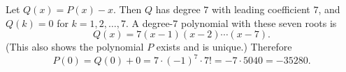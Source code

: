 Let \(Q(x)=P(x)-x\). Then \(Q\) has degree \(7\) with leading coefficient \(7\), and \(Q(k)=0\) for \(k=1,2,\dots,7\). A degree-\(7\) polynomial with these seven roots is
\[
Q(x)=7(x-1)(x-2)\cdots(x-7).
\]
(This also shows the polynomial \(P\) exists and is unique.) Therefore
\[
P(0)=Q(0)+0=7\cdot(-1)^7\cdot 7!=-7\cdot5040=\boxed{-35280}.
\]
